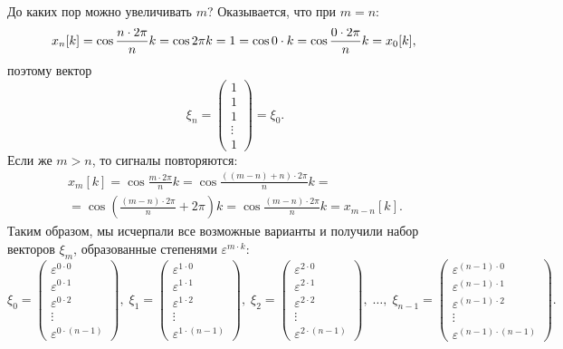 До каких пор можно увеличивать $m$? Оказывается, что при $m = n$:
\[
    x_n[k]
    = \cos \frac{n \cdot 2 \pi}{n} k
    = \cos 2 \pi k
    = 1
    = \cos 0 \cdot k
    = \cos \frac{0 \cdot 2 \pi}{n} k
    = x_0[k]
    , \\
\]
поэтому вектор
\[
    \xi_n
    = \begin{pmatrix}
        1      \\
        1      \\
        1      \\
        \vdots \\
        1
    \end{pmatrix}
    = \xi_0.
\]
Если же $m > n$, то сигналы повторяются:
\begin{multline*}
    x_m[k]
    = \cos \frac{m \cdot 2 \pi}{n} k
    = \cos \frac{((m-n) + n) \cdot 2 \pi}{n} k = \\
    = \cos \left( \frac{(m-n) \cdot 2 \pi}{n} + 2 \pi  \right) k
    = \cos \frac{(m-n) \cdot 2 \pi}{n} k
    = x_{m-n}[k].
\end{multline*}
Таким образом, мы исчерпали все возможные варианты и получили набор векторов $\xi_m$, образованные степенями $\varepsilon^{m \cdot k}$:
\[
    \xi_0
    = \begin{pmatrix}
        \varepsilon^{0 \cdot 0} \\
        \varepsilon^{0 \cdot 1} \\
        \varepsilon^{0 \cdot 2} \\
        \vdots                  \\
        \varepsilon^{0 \cdot (n-1)}
    \end{pmatrix} ,
    \;
    \xi_1
    = \begin{pmatrix}
        \varepsilon^{1 \cdot 0} \\
        \varepsilon^{1 \cdot 1} \\
        \varepsilon^{1 \cdot 2} \\
        \vdots                  \\
        \varepsilon^{1 \cdot (n-1)}
    \end{pmatrix} ,
    \;
    \xi_2
    = \begin{pmatrix}
        \varepsilon^{2 \cdot 0} \\
        \varepsilon^{2 \cdot 1} \\
        \varepsilon^{2 \cdot 2} \\
        \vdots                  \\
        \varepsilon^{2 \cdot (n-1)}
    \end{pmatrix} ,
    \;
    \dots ,
    \;
    \xi_{n-1}
    = \begin{pmatrix}
        \varepsilon^{(n-1) \cdot 0} \\
        \varepsilon^{(n-1) \cdot 1} \\
        \varepsilon^{(n-1) \cdot 2} \\
        \vdots                      \\
        \varepsilon^{(n-1) \cdot (n-1)}
    \end{pmatrix} .
\]
